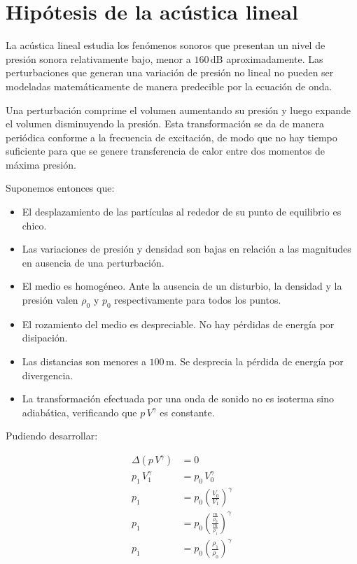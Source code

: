 \documentclass[a5paper,12pt,twoside]{book}
\begin{document}
\section{Hipótesis de la acústica lineal}
\label{sec:linAcousticHyp}

La acústica lineal estudia los fenómenos sonoros que presentan un nivel de presión sonora relativamente bajo, menor a $160\,\si{\deci\bel}$ aproximadamente.
Las perturbaciones que generan una variación de presión no lineal no pueden ser modeladas matemáticamente de manera predecible por la ecuación de onda.

Una perturbación comprime el volumen aumentando su presión y luego expande el volumen disminuyendo la presión.
Esta transformación se da de manera periódica conforme a la frecuencia de excitación, de modo que no hay tiempo suficiente para que se genere transferencia de calor entre dos momentos de máxima presión.

Suponemos entonces que:

\begin{itemize}
    \item El desplazamiento de las partículas al rededor de su punto de equilibrio es chico.

    \item Las variaciones de presión y densidad son bajas en relación a las magnitudes en ausencia de una perturbación.
    
    \item El medio es homogéneo.
    Ante la ausencia de un disturbio, la densidad y la presión valen $\rho_0$ y $p_0$ respectivamente para todos los puntos.
    
    \item El rozamiento del medio es despreciable.
    No hay pérdidas de energía por disipación.
    
    \item Las distancias son menores a $100\,\si{\metre}$.
    Se desprecia la pérdida de energía por divergencia.
    
    \item La transformación efectuada por una onda de sonido no es isoterma sino adiabática, verificando que $p\,V^\gamma$ es constante.
\end{itemize}

Pudiendo desarrollar:

\begin{align*}
    \Delta \left( p\,V^\gamma \right) &= 0
    \\
    p_1\,V_1^\gamma &= p_0\,V_0^\gamma
    \\
    p_1 &= p_0 \left(\frac{V_0}{V_1} \right)^\gamma
    \\
    p_1 &= p_0 \left( \frac{\tfrac{m}{\rho_0}}{\tfrac{m}{\rho_1}} \right)^\gamma
    \\
    p_1 &= p_0 \left( \frac{\rho_1}{\rho_0} \right)^\gamma
\end{align*}
\end{document}
